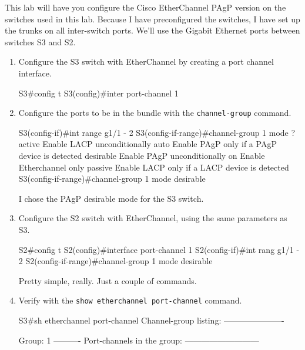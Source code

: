 This lab will have you configure the Cisco EtherChannel PAgP version on
the switches used in this lab. Because I have preconfigured the
switches, I have set up the trunks on all inter-switch ports. We'll use
the Gigabit Ethernet ports between switches S3 and S2.

\begin{enumerate}
\item
  Configure the S3 switch with EtherChannel by creating a port channel
  interface.

\begin{cli}
S3#config t
S3(config)#inter port-channel 1
\end{cli}
\item
  Configure the ports to be in the bundle with the
  \texttt{channel-group} command.

\begin{cli}
S3(config-if)#int range g1/1 - 2
S3(config-if-range)#channel-group 1 mode ?
  active     Enable LACP unconditionally
  auto       Enable PAgP only if a PAgP device is detected
  desirable  Enable PAgP unconditionally
  on         Enable Etherchannel only
  passive    Enable LACP only if a LACP device is detected
S3(config-if-range)#channel-group 1 mode desirable
\end{cli}

  I chose the PAgP desirable mode for the S3 switch.
\item
  Configure the S2 switch with EtherChannel, using the same parameters
  as S3.

\begin{cli}
S2#config t
S2(config)#interface port-channel 1
S2(config-if)#int rang g1/1 - 2
S2(config-if-range)#channel-group 1 mode desirable
\end{cli}

\begin{cli}
\end{cli}

  Pretty simple, really. Just a couple of commands.
\item
  Verify with the \texttt{show\ etherchannel\ port-channel} command.

\begin{cli}
S3#sh etherchannel port-channel
                Channel-group listing:
                ----------------------

Group: 1
----------
                Port-channels in the group:
                ---------------------------
 

\end{cli}
\end{enumerate}
